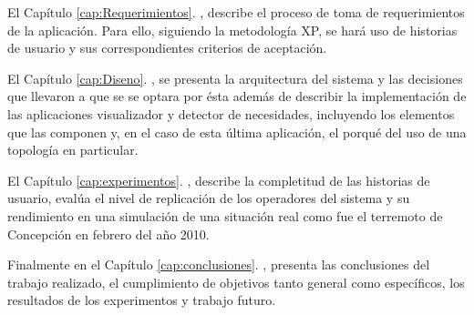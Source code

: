 El Capítulo \ref{cap:Requerimientos}. , describe el proceso de toma de requerimientos de la aplicación. Para ello, siguiendo la metodología XP, se hará uso de historias de usuario y sus correspondientes criterios de aceptación.

El Capítulo \ref{cap:Diseno}. , se presenta la arquitectura del sistema y las decisiones que llevaron a que se se optara por ésta además de describir la implementación de las aplicaciones visualizador y detector de necesidades, incluyendo los elementos que las componen y, en el caso de esta última aplicación, el porqué del uso de una topología en particular.

El Capítulo \ref{cap:experimentos}. , describe la completitud de las historias de usuario, evalúa el nivel de replicación de los operadores del sistema y su rendimiento en una simulación de una situación real como fue el terremoto de Concepción en febrero del año 2010.

Finalmente en el Capítulo \ref{cap:conclusiones}. , presenta las conclusiones del trabajo realizado, el cumplimiento de objetivos tanto general como específicos, los resultados de los experimentos y trabajo futuro.